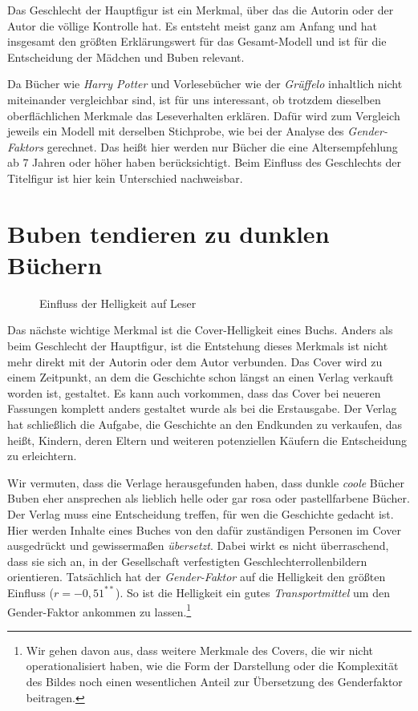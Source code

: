 Das Geschlecht der Hauptfigur ist ein Merkmal, über das die Autorin oder
der Autor die völlige Kontrolle hat. Es entsteht meist ganz am Anfang
und hat insgesamt den größten Erklärungswert für das Gesamt-Modell und
ist für die Entscheidung der Mädchen und Buben relevant.

Da Bücher wie \emph{Harry Potter} und Vorlesebücher wie der
\emph{Grüffelo} inhaltlich nicht miteinander vergleichbar sind, ist für
uns interessant, ob trotzdem dieselben oberflächlichen Merkmale das
Leseverhalten erklären. Dafür wird zum Vergleich jeweils ein Modell mit
derselben Stichprobe, wie bei der Analyse des \emph{Gender-Faktors}
gerechnet. Das heißt hier werden nur Bücher die eine Altersempfehlung ab
7 Jahren oder höher haben berücksichtigt. Beim Einfluss des Geschlechts
der Titelfigur ist hier kein Unterschied nachweisbar.

\section{Buben tendieren zu dunklen Büchern}

\begin{figure}
\center
  \label{helligkeit}
  \small

  \caption[Einfluss der Helligkeit auf Leser]{Einfluss der Helligkeit auf Leser}
\end{figure}

Das nächste wichtige Merkmal ist die Cover-Helligkeit eines Buchs.
Anders als beim Geschlecht der Hauptfigur, ist die Entstehung dieses
Merkmals ist nicht mehr direkt mit der Autorin oder dem Autor verbunden.
Das Cover wird zu einem Zeitpunkt, an dem die Geschichte schon längst an
einen Verlag verkauft worden ist, gestaltet. Es kann auch vorkommen,
dass das Cover bei neueren Fassungen komplett anders gestaltet wurde als
bei die Erstausgabe. Der Verlag hat schließlich die Aufgabe, die
Geschichte an den Endkunden zu verkaufen, das heißt, Kindern, deren
Eltern und weiteren potenziellen Käufern die Entscheidung zu
erleichtern.

Wir vermuten, dass die Verlage herausgefunden haben, dass dunkle
\emph{coole} Bücher Buben eher ansprechen als lieblich helle oder gar
rosa oder pastellfarbene Bücher. Der Verlag muss eine Entscheidung
treffen, für wen die Geschichte gedacht ist. Hier werden Inhalte eines
Buches von den dafür zuständigen Personen im Cover ausgedrückt und
gewissermaßen \emph{übersetzt}. Dabei wirkt es nicht überraschend, dass
sie sich an, in der Gesellschaft verfestigten Geschlechterrollenbildern
orientieren. Tatsächlich hat der \emph{Gender-Faktor} auf die Helligkeit
den größten Einfluss ($r=-0{,}51^{**}$). So ist die Helligkeit ein gutes
\emph{Transportmittel} um den Gender-Faktor ankommen zu
lassen.\footnote{Wir gehen davon aus, dass weitere Merkmale des Covers, die wir nicht operationalisiert haben, wie die Form der Darstellung oder die Komplexität des Bildes noch einen wesentlichen Anteil zur Übersetzung des Genderfaktor beitragen.}

